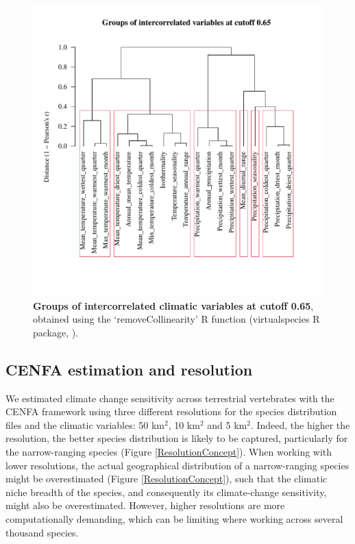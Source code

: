 \documentclass[11pt]{article}
\begin{document}
\begin{figure}[h!]
\centering
\includegraphics[scale=0.75, trim={0 1.75cm 0 0},clip]{Figures/ClimVars_groups}
\caption[Groups of intercorrelated climatic variables at cutoff 0.65]{\textbf{Groups of intercorrelated climatic variables at cutoff 0.65}, obtained using the `removeCollinearity' R function (virtualspecies R package, \citet{virtualspecies}).}
\label{}
\end{figure}


\subsection{CENFA estimation and resolution}
We estimated climate change sensitivity across terrestrial vertebrates with the CENFA framework using three different resolutions for the species distribution files and the climatic variables: 50 km$^2$, 10 km$^2$ and 5 km$^2$. Indeed, the higher the resolution, the better species distribution is likely to be captured, particularly for the narrow-ranging species (Figure \ref{ResolutionConcept}). When working with lower resolutions, the actual geographical distribution of a narrow-ranging species might be overestimated (Figure \ref{ResolutionConcept}), such that the climatic niche breadth of the species, and consequently its climate-change sensitivity, might also be overestimated. However, higher resolutions are more computationally demanding, which can be limiting where working across several thousand species. 
\end{document}
